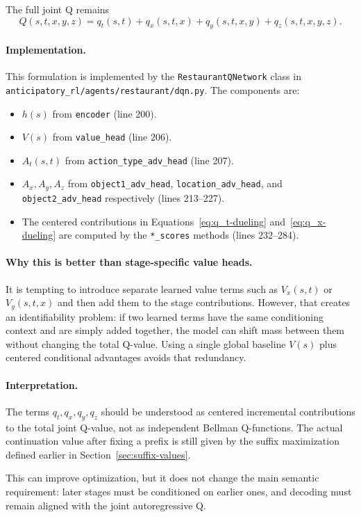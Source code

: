 \documentclass[11pt]{article}
\begin{document}
The full joint Q remains
\[
Q(s,t,x,y,z)
= q_t(s,t) + q_x(s,t,x) + q_y(s,t,x,y) + q_z(s,t,x,y,z).
\]

\paragraph{Implementation.}
This formulation is implemented by the \texttt{RestaurantQNetwork} class in \texttt{anticipatory\_rl/agents/restaurant/dqn.py}.
The components are:
\begin{itemize}
    \item $h(s)$ from \texttt{encoder} (line 200).
    \item $V(s)$ from \texttt{value\_head} (line 206).
    \item $A_t(s,t)$ from \texttt{action\_type\_adv\_head} (line 207).
    \item $A_x, A_y, A_z$ from \texttt{object1\_adv\_head}, \texttt{location\_adv\_head}, and \texttt{object2\_adv\_head} respectively (lines 213--227).
    \item The centered contributions in Equations~\eqref{eq:q_t-dueling} and~\eqref{eq:q_x-dueling} are computed by the \texttt{*\_scores} methods (lines 232--284).
\end{itemize}

\paragraph{Why this is better than stage-specific value heads.}
It is tempting to introduce separate learned value terms such as $V_x(s,t)$ or $V_y(s,t,x)$ and then add them to the stage contributions. However, that creates an identifiability problem: if two learned terms have the same conditioning context and are simply added together, the model can shift mass between them without changing the total Q-value. Using a single global baseline $V(s)$ plus centered conditional advantages avoids that redundancy.

\paragraph{Interpretation.}
The terms $q_t, q_x, q_y, q_z$ should be understood as centered incremental contributions to the total joint Q-value, not as independent Bellman Q-functions. The actual continuation value after fixing a prefix is still given by the suffix maximization defined earlier in Section~\ref{sec:suffix-values}.

This can improve optimization, but it does not change the main semantic requirement: later stages must be conditioned on earlier ones, and decoding must remain aligned with the joint autoregressive Q.
\end{document}
